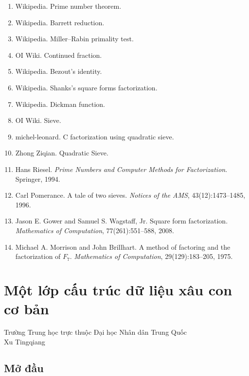 \documentclass[11pt]{article}
\begin{document}
\begin{enumerate}
  \item Wikipedia. Prime number theorem.
  \item Wikipedia. Barrett reduction.
  \item Wikipedia. Miller--Rabin primality test.
  \item OI Wiki. Continued fraction.
  \item Wikipedia. Bezout's identity.
  \item Wikipedia. Shanks's square forms factorization.
  \item Wikipedia. Dickman function.
  \item OI Wiki. Sieve.
  \item michel-leonard. C factorization using quadratic sieve.
  \item Zhong Ziqian. Quadratic Sieve.
  \item Hans Riesel. \emph{Prime Numbers and Computer Methods for
  Factorization}. Springer, 1994.
  \item Carl Pomerance. A tale of two sieves. \emph{Notices of the AMS},
  43(12):1473--1485, 1996.
  \item Jason E. Gower and Samuel S. Wagstaff, Jr. Square form factorization.
  \emph{Mathematics of Computation}, 77(261):551--588, 2008.
  \item Michael A. Morrison and John Brillhart. A method of factoring and the
  factorization of \(F_7\). \emph{Mathematics of Computation},
  29(129):183--205, 1975.
\end{enumerate}

\section{Một lớp cấu trúc dữ liệu xâu con cơ bản}

\begin{center}
Trường Trung học trực thuộc Đại học Nhân dân Trung Quốc\\
Xu Tingqiang
\end{center}

\renewcommand{\abstractname}{Tóm tắt}
\begin{abstract}
Bài viết giới thiệu một cấu trúc dữ liệu xâu mới: cấu trúc xâu con cơ bản.
Cấu trúc này mạnh ở chỗ có thể đồng thời xử lý thông tin tiền tố và hậu tố của
xâu. Bài viết cũng trình bày một số ứng dụng của cấu trúc này trong thi tin
học.
\end{abstract}

\subsection{Mở đầu}
\end{document}
